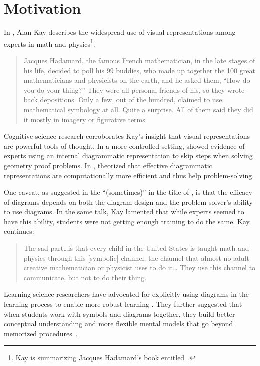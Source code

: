 \section{Motivation}
\label{sec:motivation}

In , Alan Kay describes the widespread use of visual representations among experts in math and physics\footnote{Kay is summarizing Jacques Hadamard's book entitled~\cite{hadamard_mathematicians_1945}.}:

\begin{quote}
Jacques Hadamard, the famous French mathematician, in the late stages of his life, decided to poll his 99 buddies, who made up together the 100 great mathematicians and physicists on the earth, and he asked them, ``How do you do your thing?'' They were all personal friends of his, so they wrote back depositions. Only a few, out of the hundred, claimed to use mathematical symbology at all. Quite a surprise. All of them said they did it mostly in imagery or figurative terms.\cite[52:43]{doingWithImages}
\end{quote}

\noindent Cognitive science research corroborates Kay's insight that visual representations are powerful tools of thought. In a more controlled setting,  \citet{perceptualChunks} showed evidence of experts using an internal diagrammatic representation to skip steps when solving geometry proof problems. In , \citet{whyDiagramWorth} theorized that effective diagrammatic representations are computationally more efficient and thus help problem-solving.

One caveat, as suggested in the ``(sometimes)'' in the title of \cite{whyDiagramWorth}, is that the efficacy of diagrams depends on both the diagram design and the problem-solver's ability to use diagrams. In the same talk, Kay lamented that while experts seemed to have this ability, students were not getting enough training to do the same.  Kay continues:

\begin{quote}
    The sad part\dots{}is that every child in the United States is taught math and physics through this [symbolic] channel, the channel that almost no adult creative mathematician or physicist uses to do it\dots{} They use this channel to communicate, but not to do their thing.~\cite[54:36]{doingWithImages}
\end{quote}

\noindent Learning science researchers have advocated for explicitly using diagrams in the learning process to enable more robust learning \cite{mayer_multimedia_2002}. They further suggested that when students work with symbols and diagrams together, they build better conceptual understanding and more flexible mental models that go beyond memorized procedures~\cite{multipleReps,kellman_perceptual_2010,groundedFeedback}. 

